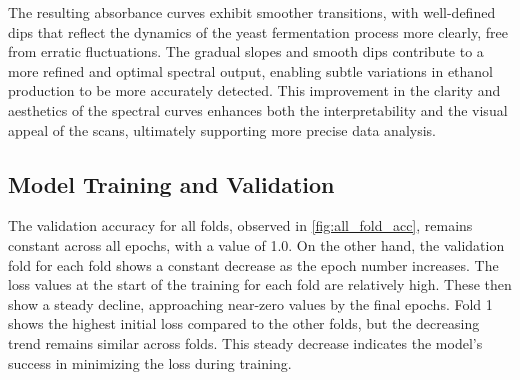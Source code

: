 \documentclass[final, 3p, 11pt]{elsarticle}
\begin{document}
The resulting absorbance curves exhibit smoother transitions, with well-defined dips that reflect the dynamics of the yeast fermentation process more clearly, free from erratic fluctuations. The gradual slopes and smooth dips contribute to a more refined and optimal spectral output, enabling subtle variations in ethanol production to be more accurately detected. This improvement in the clarity and aesthetics of the spectral curves enhances both the interpretability and the visual appeal of the scans, ultimately supporting more precise data analysis.

\subsection{Model Training and Validation}
The validation accuracy for all folds, observed in \autoref{fig:all_fold_acc}, remains constant across all epochs, with a value of 1.0. On the other hand, the validation fold for each fold shows a constant decrease as the epoch number increases. The loss values at the start of the training for each fold are relatively high. These then show a steady decline, approaching near-zero values by the final epochs. Fold 1 shows the highest initial loss compared to the other folds, but the decreasing trend remains similar across folds. This steady decrease indicates the model’s success in minimizing the loss during training.
\end{document}
